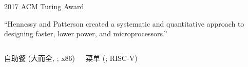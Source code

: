 \begin{frame}{}
\end{frame}

\begin{frame}{}
  \begin{center}
    2017 ACM Turing Award
  \end{center}

  \vspace{0.30cm}
  \begin{center}
    ``Hennessy and Patterson created a systematic and quantitative approach
    to designing faster, lower power,
    and  microprocessors.''
  \end{center}
\end{frame}

\begin{frame}{}
  \begin{columns}
  \end{columns}
\end{frame}

\begin{frame}{}
\end{frame}

\begin{frame}{}
\end{frame}

\begin{frame}{}
\end{frame}

\begin{frame}{}
  \begin{columns}
      \begin{center}
        自助餐 (大而全, ; x86)
      \end{center}
      \begin{center}
        菜单 (; RISC-V)
      \end{center}
  \end{columns}
\end{frame}


